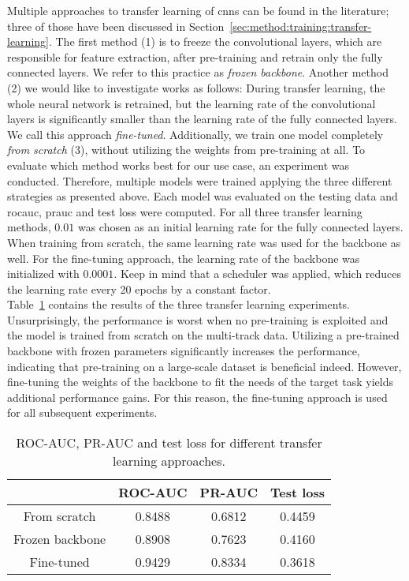 Multiple approaches to transfer learning of \glspl{cnn} can be found in the literature; three of those have been discussed in Section~\ref{sec:method:training:transfer-learning}. The first method (1) is to freeze the convolutional layers, which are responsible for feature extraction, after pre-training and retrain only the fully connected layers. We refer to this practice as \textit{frozen backbone}. Another method (2) we would like to investigate works as follows: During transfer learning, the whole neural network is retrained, but the learning rate of the convolutional layers is significantly smaller than the learning rate of the fully connected layers. We call this approach \textit{fine-tuned}. Additionally, we train one model completely \textit{from scratch} (3), without utilizing the weights from pre-training at all. To evaluate which method works best for our use case, an experiment was conducted. Therefore, multiple models were trained applying the three different strategies as presented above. Each model was evaluated on the testing data and \gls{rocauc}, \gls{prauc} and test loss were computed. For all three transfer learning methods, $0.01$ was chosen as an initial learning rate for the fully connected layers. When training from scratch, the same learning rate was used for the backbone as well. For the fine-tuning approach, the learning rate of the backbone was initialized with $0.0001$. Keep in mind that a scheduler was applied, which reduces the learning rate every 20 epochs by a constant factor.\\

Table~\ref{tab:transfer-learning-experiment} contains the results of the three transfer learning experiments. Unsurprisingly, the performance is worst when no pre-training is exploited and the model is trained from scratch on the multi-track data. Utilizing a pre-trained backbone with frozen parameters significantly increases the performance, indicating that pre-training on a large-scale dataset is beneficial indeed. However, fine-tuning the weights of the backbone to fit the needs of the target task yields additional performance gains. For this reason, the fine-tuning approach is used for all subsequent experiments.
\begin{table}[]
	\centering
	\begin{tabular}{c|c|c|c}
	& ROC-AUC & PR-AUC & Test loss\\ \hline
		From scratch  & 0.8488 & 0.6812 & 0.4459\\ \hline
		Frozen backbone  & 0.8908  & 0.7623 & 0.4160\\ \hline
		Fine-tuned & 0.9429  & 0.8334 & 0.3618\\
	\end{tabular}
	\caption{ROC-AUC, PR-AUC and test loss for different transfer learning approaches.}
	\label{tab:transfer-learning-experiment}
\end{table}

